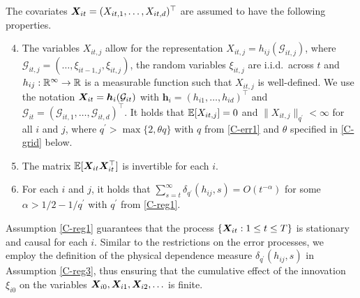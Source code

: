 \documentclass[a4paper,12pt]{article}
\begin{document}
The covariates $\boldsymbol{X}_{it} = (X_{it,1},\ldots, X_{it, d})^\top$ are assumed to have the following properties. 
\begin{enumerate}[label=(C\arabic*),leftmargin=1.05cm]
\setcounter{enumi}{3}
\item \label{C-reg1} The variables $X_{it, j}$ allow for the representation $X_{it, j} = h_{ij}(\mathcal{G}_{it, j})$, where $\mathcal{G}_{it, j} = (\ldots, \xi_{it-1,j}, \xi_{it, j})$, the random variables $\xi_{it, j}$ are i.i.d.\ across $t$ and $h_{ij}: \mathbb{R}^\infty \rightarrow \mathbb{R}$ is a measurable function such that $X_{it, j}$ is well-defined. We use the notation $\boldsymbol{X}_{it} = \boldsymbol{h}_{i}(\mathcal{G}_{it})$ with $\boldsymbol{h}_i = (h_{i1}, \ldots, h_{id})^\top$ and $\mathcal{G}_{it} = (\mathcal{G}_{it,1}, \ldots, \mathcal{G}_{it, d})^\top$. It holds that $\mathbb{E} [X_{it, j}]=0$ and $\| X_{it, j} \|_{q^\prime} <\infty$ for all $i$ and $j$, where $q^\prime > \max \{ 2, \theta q \}$ with $q$ from \ref{C-err1} and $\theta$ specified in \ref{C-grid} below.
\item \label{C-reg2} The matrix $\mathbb{E}[\boldsymbol{X}_{it} \boldsymbol{X}_{it}^\top]$ is invertible for each $i$.
\item \label{C-reg3} For each $i$ and $j$, it holds that $\sum_{s=t}^{\infty} \delta_{q^\prime}(h_{ij}, s)= O(t^{-\alpha})$ for some $\alpha > 1/2 - 1/{q^\prime}$ with $q^\prime$ from \ref{C-reg1}.
\end{enumerate}
Assumption \ref{C-reg1} guarantees that the process $\{ \boldsymbol{X}_{it}: 1 \le t \le T \}$ is stationary and causal for each $i$. Similar to the restrictions on the error processes, we employ the definition of the physical dependence measure $\delta_{q^\prime}(h_{ij}, s)$ in Assumption \ref{C-reg3}, thus ensuring that the cumulative effect of the innovation $\xi_{i0}$ on the variables $\boldsymbol{X}_{i0}, \boldsymbol{X}_{i1}, \boldsymbol{X}_{i2},\ldots$ is finite. 
\end{document}
